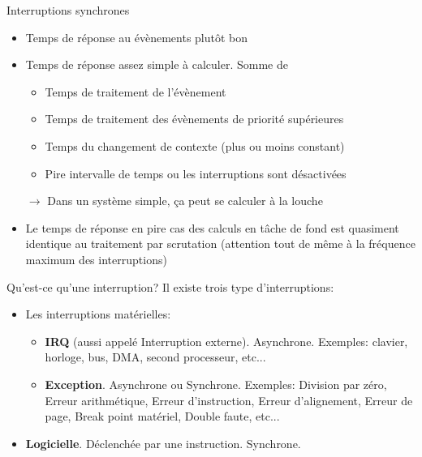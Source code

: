 \begin{frame}{Interruptions synchrones}
  \begin{itemize}
  \item Temps de réponse au évènements plutôt bon
  \item Temps de réponse assez simple à calculer. Somme de
    \begin{itemize}
    \item Temps de traitement de l'évènement
    \item Temps de traitement des évènements de priorité supérieures
    \item Temps du changement de contexte (plus ou moins constant)
    \item Pire intervalle de temps ou les interruptions sont désactivées
    \end{itemize}
  \item[$\rightarrow$] Dans  un système simple, ça peut  se calculer à
    la louche
  \item Le  temps de réponse en pire  cas des calculs en  tâche de fond
    est quasiment  identique au traitement  par scrutation (attention
    tout de même à la fréquence maximum des interruptions)
  \end{itemize}
\end{frame}

\begin{frame}{Qu'est-ce qu'une interruption?}
  Il existe trois type d'interruptions:
  \begin{itemize}
  \item Les interruptions matérielles:
    \begin{itemize}
    \item   \textbf{IRQ}    (aussi   appelé   Interruption   externe).
      Asynchrone.   Exemples:  clavier,   horloge,  bus,  DMA,  second
      processeur, etc...
    \item  \textbf{Exception}.   Asynchrone  ou Synchrone.   Exemples:
      Division  par zéro,  Erreur arithmétique,  Erreur d'instruction,
      Erreur  d'alignement,  Erreur  de  page, Break  point  matériel,
      Double faute, etc...


    \end{itemize}
  \item \textbf{Logicielle}. Déclenchée par une instruction. Synchrone.
  \end{itemize}
\end{frame}

